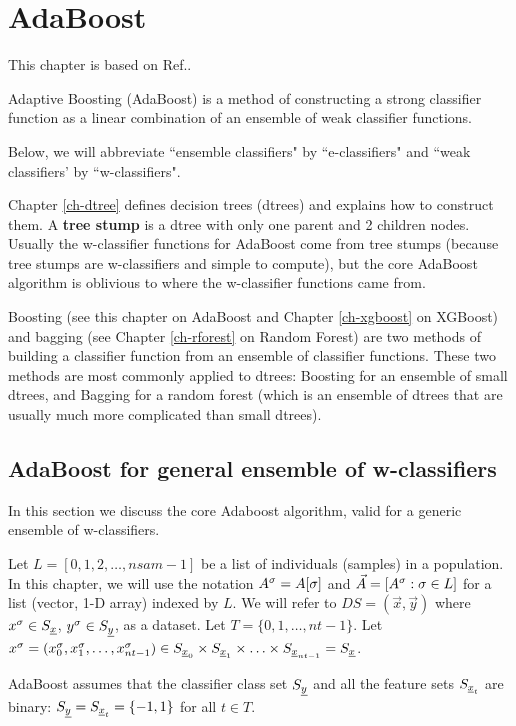 \chapter{AdaBoost}
\label{ch-adaboost}

This chapter
is based on Ref.\cite{wiki-adaboost}.


Adaptive Boosting (AdaBoost) is 
a method of constructing
a strong
classifier function
as a linear 
combination
of an ensemble
of weak classifier
functions.

Below,
we will abbreviate
``ensemble classifiers" by ``e-classifiers"
and ``weak classifiers' by ``w-classifiers".


Chapter \ref{ch-dtree}
defines decision trees (dtrees)
and explains how to construct them.
A
{\bf tree stump}
is a dtree  with only one
parent and 2 children nodes.
Usually the 
w-classifier functions
for AdaBoost
come from tree stumps
(because tree stumps
are w-classifiers
and simple to compute), but
the core
AdaBoost algorithm
is oblivious to 
where the w-classifier functions came from.

Boosting
(see this chapter on AdaBoost
and
Chapter \ref{ch-xgboost} on XGBoost)
and bagging
(see Chapter \ref{ch-rforest} on Random Forest)
are two methods
of building a classifier function
from an ensemble 
of classifier functions.
These two methods are most commonly
applied to dtrees: Boosting for an ensemble of
small dtrees, and Bagging for a random
forest (which
is an ensemble
of dtrees that are usually much more
complicated than small dtrees).


\section{AdaBoost for general ensemble
of w-classifiers}
In this 
section 
we discuss the core Adaboost
algorithm,
valid for a generic ensemble of w-classifiers.

Let $L=[0,1,2, \ldots, nsam-1]$ be a list of
individuals (samples) in a population.
In this chapter, we will use the notation 
$A^\sigma=A[\sigma]$ 
and $\vec{A}=[A^\sigma:\sigma\in L]$
for a  list (vector, 1-D  array) indexed by $L$.
We will refer to $DS=(\vec{x}, \vec{y})$ 
where $x^\sigma\in S_{\underline{x}}$, $y^\sigma\in S_{\underline{y}}$,
as a dataset. 
Let $T=\{0,1, \dots, nt-1\}$.
Let
$x^\sigma=(x^\sigma_0, x^\sigma_1, \ldots, x^\sigma_{nt-1})
\in S_{{\underline{x}}_0}\times S_{{\underline{x}}_1}
\times\ldots\times
 S_{{\underline{x}}_{nt-1}}=S_{\underline{x}}$.

AdaBoost assumes
that the classifier class set
$S_{\underline{y}}$  and
all the feature sets $S_{{\underline{x}}_t}$ 
are
binary:
$S_{\underline{y}}=S_{{\underline{x}}_t}=\{-1, 1\}$ for 
all $t\in T$.


